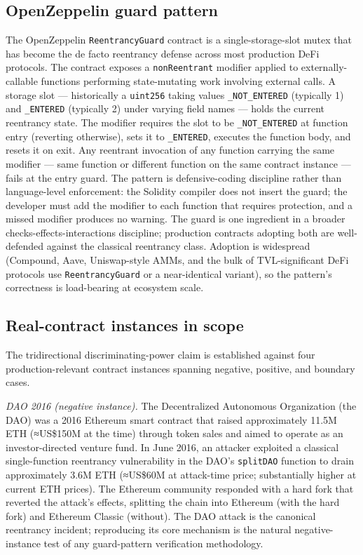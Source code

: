 \subsection{OpenZeppelin guard
pattern}\label{openzeppelin-guard-pattern}

The OpenZeppelin \texttt{ReentrancyGuard} contract is a
single-storage-slot mutex that has become the de facto reentrancy
defense across most production DeFi protocols. The contract exposes a
\texttt{nonReentrant} modifier applied to externally-callable functions
performing state-mutating work involving external calls. A storage slot
--- historically a \texttt{uint256} taking values
\texttt{\_NOT\_ENTERED} (typically 1) and \texttt{\_ENTERED} (typically
2) under varying field names --- holds the current reentrancy state. The
modifier requires the slot to be \texttt{\_NOT\_ENTERED} at function
entry (reverting otherwise), sets it to \texttt{\_ENTERED}, executes the
function body, and resets it on exit. Any reentrant invocation of any
function carrying the same modifier --- same function or different
function on the same contract instance --- fails at the entry guard. The
pattern is defensive-coding discipline rather than language-level
enforcement: the Solidity compiler does not insert the guard; the
developer must add the modifier to each function that requires
protection, and a missed modifier produces no warning. The guard is one
ingredient in a broader checks-effects-interactions discipline;
production contracts adopting both are well-defended against the
classical reentrancy class. Adoption is widespread (Compound, Aave,
Uniswap-style AMMs, and the bulk of TVL-significant DeFi protocols use
\texttt{ReentrancyGuard} or a near-identical variant), so the pattern's
correctness is load-bearing at ecosystem scale.

\subsection{Real-contract instances in
scope}\label{real-contract-instances-in-scope}

The tridirectional discriminating-power claim is established against
four production-relevant contract instances spanning negative, positive,
and boundary cases.

\emph{DAO 2016 (negative instance).} The Decentralized Autonomous
Organization (the DAO) was a 2016 Ethereum smart contract that raised
approximately 11.5M ETH (≈US\$150M at the time) through token sales and
aimed to operate as an investor-directed venture fund. In June 2016, an
attacker exploited a classical single-function reentrancy vulnerability
in the DAO's \texttt{splitDAO} function to drain approximately 3.6M ETH
(≈US\$60M at attack-time price; substantially higher at current ETH
prices). The Ethereum community responded with a hard fork that reverted
the attack's effects, splitting the chain into Ethereum (with the hard
fork) and Ethereum Classic (without). The DAO attack is the canonical
reentrancy incident; reproducing its core mechanism is the natural
negative-instance test of any guard-pattern verification methodology.

